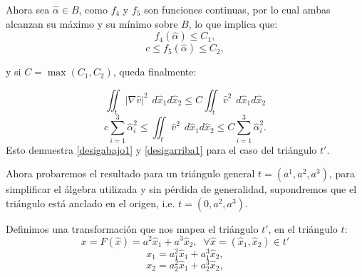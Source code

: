 \documentclass[12pt,spanish,oneside]{book}
\theoremstyle{plain}
\numberwithin{equation}{chapter}
\theoremstyle{definition}
\theoremstyle{remark}
\newcommand{\dxhat}{\hspace{5pt} d\hat{x}_1d\hat{x}_2}
\begin{document}
Ahora sea $\hat{\alpha}\in B$, como $f_4$ y $f_5$ son funciones continuas, por lo cual ambas alcanzan su máximo y su mínimo sobre $B$, lo que implica que:
\[f_4(\hat{\alpha})\leq C_1,\] 
\[c\leq f_5(\hat{\alpha})\leq C_2,\] 

y si $C=\max(C_1,C_2)$, queda finalmente: 

\[\iint_t|\nabla\hat{v}|^2 \dxhat\leq C\iint_t\hat{v}^2 \dxhat \]
\[c\sum_{i=1}^3\hat{\alpha}_i^2\leq \iint_t\hat{v}^2 \dxhat \leq C\sum_{i=1}^3\hat{\alpha}_i^2.\]Esto demuestra \ref{desigabajo1} y \ref{desigarriba1} para el caso del triángulo $t'$.

Ahora probaremos el resultado para un triángulo general $t=(a^1,a^2,a^3)$, para simplificar el álgebra utilizada y sin pérdida de generalidad, supondremos que el triángulo está anclado en el origen, i.e. $t=(0,a^2,a^3)$. 

Definimos una transformación que nos mapea el triángulo $t'$, en el triángulo $t$: 
\[x=F(\hat{x})=a^2\hat{x}_1 + a^3\hat{x}_2, \phantom{\pi}\forall \hat{x}=(\hat{x}_1,\hat{x}_2)\in t' \]
\[x_1=a^2_1\hat{x}_1 + a^3_1\hat{x}_2, \]
\[x_2=a^2_2\hat{x}_1 + a^3_2\hat{x}_2 , \]
\end{document}
